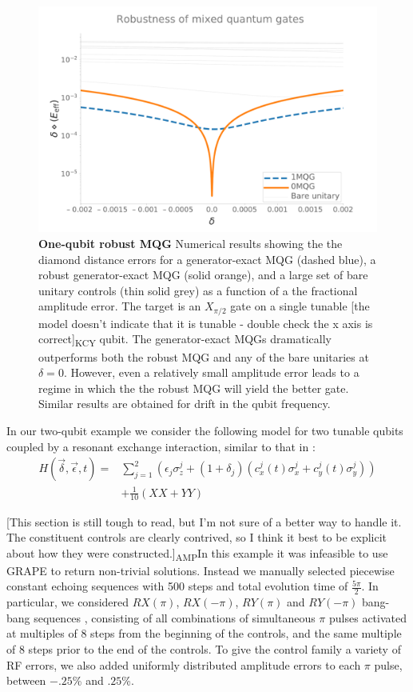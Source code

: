 \documentclass[aps,nofootinbib,pra,notitlepage,twocolumn]{revtex4-1}
\newcommand{\kcy}[1]{{\color{red}[#1]\textsubscript{\rm{KCY}}}}
\newcommand{\amp}[1]{{\color{red}[#1]\textsubscript{\rm{AMP}}}}
\newcommand{\0}{\ensuremath{\mathbf{0}}}
\begin{document}
{\begin{figure}[h]
  \centering
  \includegraphics[width=\columnwidth]{figures/1q_robustness_delta.pdf}
  \caption{\textbf{One-qubit robust MQG} Numerical results showing the the diamond distance errors for a generator-exact MQG (dashed blue), a robust generator-exact MQG (solid orange), and a large set of bare unitary controls (thin solid grey) as a function of a the fractional amplitude error. The target is an $X_{\pi/2}$ gate on a single tunable \kcy{the model doesn't indicate that it is tunable - double check the x axis is correct} qubit. The generator-exact MQGs dramatically outperforms both the robust MQG and any of the bare unitaries at $\delta=0$. However, even a relatively small amplitude error leads to a regime in which the the robust MQG will yield the better gate. Similar results are obtained for drift in the qubit frequency.}
  \label{fig:YMQG}
\end{figure}

In our two-qubit example we consider the following model for two tunable qubits coupled by a resonant exchange interaction, similar to that in \cite{McKay2016}:
\begin{equation} \label{eq:2Qham}
\begin{split}
H(\vec{\delta}, \vec{\epsilon}, t) = &\sum_{j=1}^2(\epsilon_j\sigma_z^j + (1 + \delta_j)(c_x^j(t)\sigma_x^j + c_y^j(t)\sigma_y^j)) \\
&+ \frac{1}{10}(XX + YY)
\end{split}
\end{equation}

\amp{This section is still tough to read, but I'm not sure of a better way to handle it. The constituent controls are clearly contrived, so I think it best to be explicit about how they were constructed.}In this example it was infeasible to use GRAPE to return non-trivial solutions. Instead we manually selected piecewise constant echoing sequences with 500 steps and total evolution time of $\frac{5\pi}{2}$. In particular, we considered $RX(\pi)$, $RX(-\pi)$, $RY(\pi)$ and $RY(-\pi)$ bang-bang sequences \cite{bangbang}, consisting of all combinations of simultaneous $\pi$ pulses activated at multiples of $8$ steps from the beginning of the controls, and the same multiple of $8$ steps prior to the end of the controls. To give the control family a variety of RF errors, we also added uniformly distributed amplitude errors to each $\pi$ pulse, between $-.25$\% and $.25$\%.

}
\end{document}
